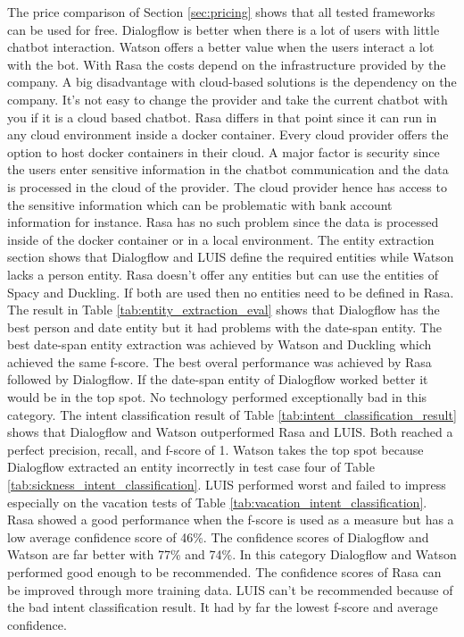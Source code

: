 The price comparison of Section \ref{sec:pricing} shows that all 
tested frameworks can be used for free.
Dialogflow is better when there is a lot of users with little chatbot interaction.
Watson offers a better value when the users interact a lot with the bot.
With Rasa the costs depend on the infrastructure provided by the company.
A big disadvantage with cloud-based solutions is the dependency on the company.
It's not easy to change the provider and take the current chatbot with you if it 
is a cloud based chatbot. 
Rasa differs in that point since it can run in any cloud environment inside a docker container.
Every cloud provider offers the option to host docker containers in their cloud.
A major factor is security since the users enter sensitive information in the chatbot communication
and the data is processed in the cloud of the provider.
The cloud provider hence has access to the sensitive information which can be problematic with
bank account information for instance.
Rasa has no such problem since the data is processed inside of the docker container or in a 
local environment.
The entity extraction section shows that Dialogflow and LUIS 
define the required entities while Watson lacks a person entity.
Rasa doesn't offer any entities but can use the entities of 
Spacy and Duckling.
If both are used then no entities need to be defined in Rasa.
The result in Table \ref{tab:entity_extraction_eval} shows that 
Dialogflow has the best person and date entity but it 
had problems with the date-span entity.
The best date-span entity extraction was achieved by Watson and Duckling which
achieved the same f-score.
The best overal performance was achieved by Rasa followed by Dialogflow.
If the date-span entity of Dialogflow worked better it would be in the top spot.
No technology performed exceptionally bad in this category.
The intent classification result of Table \ref{tab:intent_classification_result}
shows that Dialogflow and Watson outperformed Rasa and LUIS.
Both reached a perfect precision, recall, and f-score of 1.
Watson takes the top spot because Dialogflow extracted an entity incorrectly 
in test case four of Table \ref{tab:sickness_intent_classification}.
LUIS performed worst and failed to impress especially on the vacation tests
of Table \ref{tab:vacation_intent_classification}.
Rasa showed a good performance when the f-score is used as a measure but 
has a low average confidence score of 46\%.
The confidence scores of Dialogflow and Watson are far better with 77\% and 74\%.
In this category Dialogflow and Watson performed good enough to be recommended.
The confidence scores of Rasa can be improved through more training data.
LUIS can't be recommended because of the bad intent classification result.
It had by far the lowest f-score and average confidence.


